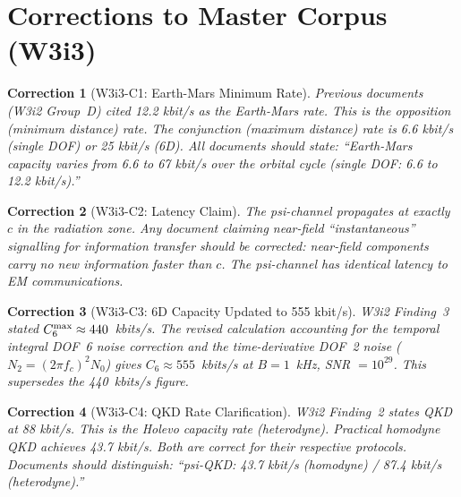 \documentclass[aps,prd,twocolumn,superscriptaddress,nofootinbib]{revtex4-2}
\newtheorem{correction}{Correction}
\begin{document}
\section{Corrections to Master Corpus (W3i3)}
\label{sec:corrections}

\begin{correction}[W3i3-C1: Earth-Mars Minimum Rate]
Previous documents (W3i2 Group~D) cited 12.2 kbit/s as the Earth-Mars rate.
This is the \emph{opposition} (minimum distance) rate. The \emph{conjunction}
(maximum distance) rate is 6.6 kbit/s (single DOF) or 25 kbit/s (6D).
All documents should state: ``Earth-Mars capacity varies from 6.6 to 67 kbit/s
over the orbital cycle (single DOF: 6.6 to 12.2 kbit/s).''
\end{correction}

\begin{correction}[W3i3-C2: Latency Claim]
The psi-channel propagates at exactly $c$ in the radiation zone.
Any document claiming near-field ``instantaneous'' signalling for
information transfer should be corrected: near-field components carry
no new information faster than $c$. The psi-channel has identical
latency to EM communications.
\end{correction}

\begin{correction}[W3i3-C3: 6D Capacity Updated to 555 kbit/s]
W3i2 Finding~3 stated $C_6^{\rm max} \approx 440$~kbits/s. The revised
calculation accounting for the temporal integral DOF~6 noise correction
and the time-derivative DOF~2 noise ($N_2 = (2\pi f_c)^2 N_0$) gives
$C_6 \approx 555$~kbits/s at $B = 1$~kHz, SNR $= 10^{29}$.
This supersedes the 440~kbits/s figure.
\end{correction}

\begin{correction}[W3i3-C4: QKD Rate Clarification]
W3i2 Finding~2 states QKD at 88 kbit/s. This is the Holevo capacity rate
(heterodyne). Practical homodyne QKD achieves 43.7 kbit/s.
Both are correct for their respective protocols. Documents should
distinguish: ``psi-QKD: 43.7 kbit/s (homodyne) / 87.4 kbit/s (heterodyne).''
\end{correction}

\end{document}
